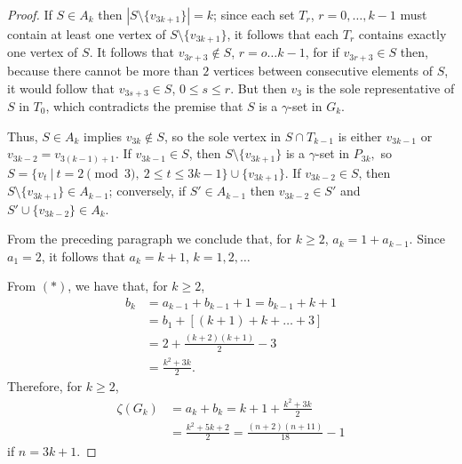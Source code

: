 \documentclass[10pt,a4paper]{amsart}
\newcommand{\ds}{\displaystyle}
\begin{document}
\begin{proof}
	\indent If $S\in A_k$ then $|S\setminus \{v_{3k+1}\}|=k$; since each set $T_r$, $r=0, \ldots, k-1$ must contain at least one vertex of $S\setminus \{v_{3k+1}\}$, it follows that each $T_r$ contains exactly one vertex of $S$. It follows that $v_{3r+3}\notin S$, $r=o\ldots k-1$, for if $v_{3r+3}\in S$ then, because there cannot be more than $2$ vertices between consecutive elements of $S$, it would follow that $v_{3s+3}\in S$, $0\le s \le r$. But then $v_3$ is the sole representative of $S$ in $T_0$, which contradicts the premise that $S$ is a $\gamma$-set in $G_k$. 
	
	\indent Thus, $S\in A_k$ implies $v_{3k}\notin S$, so the sole vertex in $S\cap T_{k-1}$ is either $v_{3k-1}$ or $v_{3k-2}=v_{3(k-1)+1}$. If $v_{3k-1} \in S$, then $S\setminus \{v_{3k+1}\}$ is a $\gamma$-set in $P_{3k},$ so $S=\{v_t\ | \ t=2\pmod 3, \ 2\le t\le 3k-1\} \cup \{v_{3k+1}\}$. If $v_{3k-2} \in S$, then $S\setminus \{v_{3k+1}\} \in A_{k-1}$; conversely, if $S' \in A_{k-1}$ then $v_{3k-2} \in S'$ and $S'\cup \{v_{3k-2}\}\in A_k$.
	
	\indent From the preceding paragraph we conclude that, for $k\ge 2$, $a_k=1+a_{k-1}$. Since $a_1=2$, it follows that $a_k=k+1$, $k=1,2, \ldots$
	
	\indent From $(*)$, we have that, for $k\ge 2$,
	\begin{align}
	    b_k&=a_{k-1}+b_{k-1}+1 =b_{k-1}+k+1 \nonumber \\
	    &= b_1+[(k+1)+k+\ldots + 3] \nonumber \\
	    &=2+\frac{(k+2)(k+1)}2-3 \nonumber \\
	    &=\frac{k^2+3k}2. \nonumber
	\end{align} 
	Therefore, for $k\ge 2$,
	\begin{align}
	    \zeta(G_k)&=a_k+b_k=k+1+\frac{k^2+3k}2 \nonumber \\
	    &=\frac{k^2+5k+2}2 = \frac{(n+2)(n+11)}{18}-1 \nonumber
	\end{align}
	if $n=3k+1$.
	
	
	
	
	
	
	
\end{proof}
\end{document}
